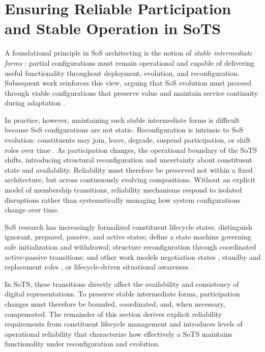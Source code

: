 \section{Ensuring Reliable Participation and Stable Operation in SoTS}
A foundational principle in SoS architecting is the notion of \emph{stable intermediate forms} \cite{maier1998architecting}: partial configurations must remain operational and capable of delivering useful functionality throughout deployment, evolution, and reconfiguration. Subsequent work reinforces this view, arguing that SoS evolution must proceed through viable configurations that preserve value and maintain service continuity during adaptation \cite{rechtin1991systems, rechtin2010art, mekdeci2014pliability, petitdemange2021design, weyns2013challenges}. 

In practice, however, maintaining such stable intermediate forms is difficult because SoS configurations are not static. Reconfiguration is intrinsic to SoS evolution: constituents may join, leave, degrade, suspend participation, or shift roles over time \cite{fang2020improving, manzano2020dynamic, pradhan2016achieving, mohsin2019modeling}. As participation changes, the operational boundary of the SoTS shifts, introducing structural reconfiguration and uncertainty about constituent state and availability. Reliability must therefore be preserved not within a fixed architecture, but across continuously evolving compositions. Without an explicit model of membership transitions, reliability mechanisms respond to isolated disruptions rather than systematically managing how system configurations change over time.

SoS research has increasingly formalized constituent lifecycle states. \citet{axelsson2019refined} distinguish ignorant, prepared, passive, and active states; \citet{hristozov2023modeling} define a state machine governing safe initialization and withdrawal; \citet{petitdemange2021design} structure reconfiguration through coordinated active-passive transitions; and other work models negotiation states \cite{qin2016contract}, standby and replacement roles \cite{du2024reconfiguration}, or lifecycle-driven situational awareness \cite{svenson2020situation}. 

In SoTS, these transitions directly affect the availability and consistency of digital representations. To preserve stable intermediate forms, participation changes must therefore be bounded, coordinated, and, when necessary, compensated. The remainder of this section derives explicit reliability requirements from constituent lifecycle management and introduces levels of operational reliability that characterize how effectively a SoTS maintains functionality under reconfiguration and evolution. 


